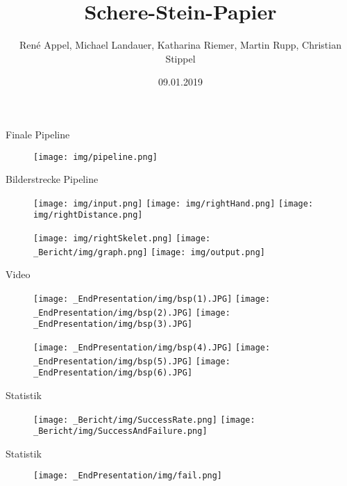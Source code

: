 \documentclass[aspectratio=169]{beamer}
\title[Your Short Title]{Schere-Stein-Papier}
\author{René Appel, Michael Landauer, Katharina Riemer, Martin Rupp, Christian Stippel}
\institute{Einführung in die digitale Bildverarbeitung 2018W}
\date{09.01.2019}
\begin{document}
\begin{frame}
  \titlepage
\end{frame}

\begin{frame}{Finale Pipeline}
\begin{figure}
    \centering
    \texttt{[image: img/pipeline.png]}
\end{figure}
\end{frame}

\begin{frame}{Bilderstrecke Pipeline}
\begin{figure}
    \centering
    \texttt{[image: img/input.png]}
    \texttt{[image: img/rightHand.png]}
    \texttt{[image: img/rightDistance.png]}

    \texttt{[image: img/rightSkelet.png]}
    \texttt{[image: \_Bericht/img/graph.png]}
    \texttt{[image: img/output.png]}

\end{figure}
\end{frame}

\begin{frame}{Video}
 \begin{figure}
    \centering
    \texttt{[image: \_EndPresentation/img/bsp(1).JPG]}
    \texttt{[image: \_EndPresentation/img/bsp(2).JPG]}
    \texttt{[image: \_EndPresentation/img/bsp(3).JPG]}

    \texttt{[image: \_EndPresentation/img/bsp(4).JPG]}
    \texttt{[image: \_EndPresentation/img/bsp(5).JPG]}
    \texttt{[image: \_EndPresentation/img/bsp(6).JPG]}
\end{figure}
\end{frame}

\begin{frame}{Statistik} %
\begin{figure}
    \centering
    \texttt{[image: \_Bericht/img/SuccessRate.png]}
    \texttt{[image: \_Bericht/img/SuccessAndFailure.png]}
\end{figure}
\end{frame}

\begin{frame}{Statistik} %
\begin{figure}
    \centering
    \texttt{[image: \_EndPresentation/img/fail.png]}
\end{figure}

\end{frame}
\end{document}
